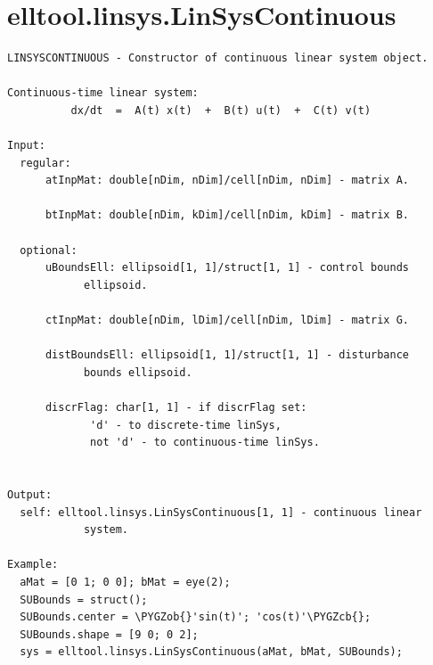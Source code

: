 \documentclass[letterpaper,10pt,english]{sphinxmanual}
\def\PYGZob{\char`\{}
\def\PYGZcb{\char`\}}
\begin{document}
\section{elltool.linsys.LinSysContinuous}
\label{chap_func:elltool-linsys-linsyscontinuous}
\begin{Verbatim}[commandchars=\\\{\}]
LINSYSCONTINUOUS - Constructor of continuous linear system object.

Continuous-time linear system:
          dx/dt  =  A(t) x(t)  +  B(t) u(t)  +  C(t) v(t)

Input:
  regular:
      atInpMat: double[nDim, nDim]/cell[nDim, nDim] - matrix A.

      btInpMat: double[nDim, kDim]/cell[nDim, kDim] - matrix B.

  optional:
      uBoundsEll: ellipsoid[1, 1]/struct[1, 1] - control bounds
            ellipsoid.

      ctInpMat: double[nDim, lDim]/cell[nDim, lDim] - matrix G.

      distBoundsEll: ellipsoid[1, 1]/struct[1, 1] - disturbance
            bounds ellipsoid.

      discrFlag: char[1, 1] - if discrFlag set:
             'd' - to discrete-time linSys,
             not 'd' - to continuous-time linSys.


Output:
  self: elltool.linsys.LinSysContinuous[1, 1] - continuous linear
            system.

Example:
  aMat = [0 1; 0 0]; bMat = eye(2);
  SUBounds = struct();
  SUBounds.center = \PYGZob{}'sin(t)'; 'cos(t)'\PYGZcb{};
  SUBounds.shape = [9 0; 0 2];
  sys = elltool.linsys.LinSysContinuous(aMat, bMat, SUBounds);
\end{Verbatim}
\end{document}
